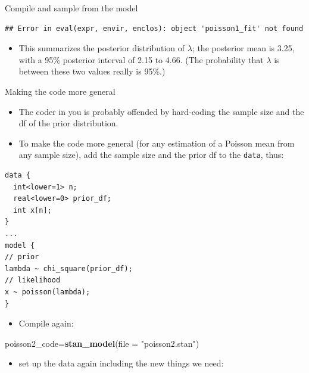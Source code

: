\documentclass[ignorenonframetext,]{beamer}
\newenvironment{Shaded}{\begin{snugshade}}{\end{snugshade}}
\newcommand{\DataTypeTok}[1]{\textcolor[rgb]{0.13,0.29,0.53}{#1}}
\newcommand{\KeywordTok}[1]{\textcolor[rgb]{0.13,0.29,0.53}{\textbf{#1}}}
\newcommand{\NormalTok}[1]{#1}
\newcommand{\StringTok}[1]{\textcolor[rgb]{0.31,0.60,0.02}{#1}}
\providecommand{\tightlist}{%
  \setlength{\itemsep}{0pt}\setlength{\parskip}{0pt}}
\begin{document}
\begin{frame}[fragile]{Compile and sample from the model}
\begin{verbatim}
## Error in eval(expr, envir, enclos): object 'poisson1_fit' not found
\end{verbatim}

\begin{itemize}
\tightlist
\item
  This summarizes the posterior distribution of \(\lambda\); the
  posterior mean is 3.25, with a 95\% posterior interval of 2.15 to
  4.66. (The probability that \(\lambda\) is between these two values
  really is 95\%.)
\end{itemize}

\end{frame}

\begin{frame}[fragile]{Making the code more general}
\protect\hypertarget{making-the-code-more-general}{}

\begin{itemize}
\tightlist
\item
  The coder in you is probably offended by hard-coding the sample size
  and the df of the prior distribution.
\item
  To make the code more general (for any estimation of a Poisson mean
  from any sample size), add the sample size and the prior df to the
  \texttt{data}, thus:
\end{itemize}

\begin{verbatim}
data {
  int<lower=1> n;
  real<lower=0> prior_df;
  int x[n];
}
...
model {
// prior
lambda ~ chi_square(prior_df);
// likelihood
x ~ poisson(lambda);
}
\end{verbatim}

\begin{itemize}
\tightlist
\item
  Compile again:
\end{itemize}

\begin{Shaded}
\begin{Highlighting}[]
\NormalTok{poisson2_code=}\KeywordTok{stan_model}\NormalTok{(}\DataTypeTok{file =} \StringTok{"poisson2.stan"}\NormalTok{)}
\end{Highlighting}
\end{Shaded}

\begin{itemize}
\tightlist
\item
  set up the data again including the new things we need:
\end{itemize}


\end{frame}
\end{document}
